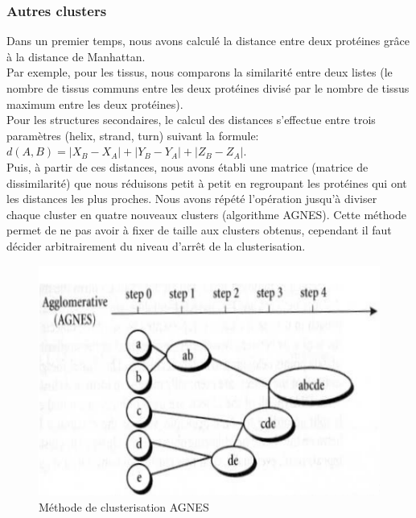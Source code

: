 \subsubsection*{Autres clusters}
Dans un premier temps, nous avons calculé la distance entre deux protéines gr\^ace à la distance de Manhattan.\\
Par exemple, pour les tissus, nous comparons la similarité entre deux listes (le nombre de tissus communs entre les deux protéines divisé par le nombre de tissus maximum entre les deux protéines).\\
Pour les structures secondaires, le calcul des distances s'effectue entre trois paramètres (helix, strand, turn) suivant la formule: 
    $d(A,B)=|X_B-X_A|+|Y_B-Y_A|+|Z_B-Z_A|$.\\

Puis, à partir de ces distances, nous avons établi une matrice (matrice de dissimilarité) que nous réduisons petit à petit en regroupant les protéines qui ont les distances les plus proches. Nous avons répété l'opération jusqu'à diviser chaque cluster en quatre nouveaux clusters (algorithme AGNES). Cette méthode permet de ne pas avoir à fixer de taille aux clusters obtenus, cependant il faut décider arbitrairement du niveau d'arr\^et de la clusterisation.

\begin{figure}
\begin{center}
\includegraphics[scale=0.6]{agnes.png}
\caption{Méthode de clusterisation AGNES}
\end{center}
\end{figure}



